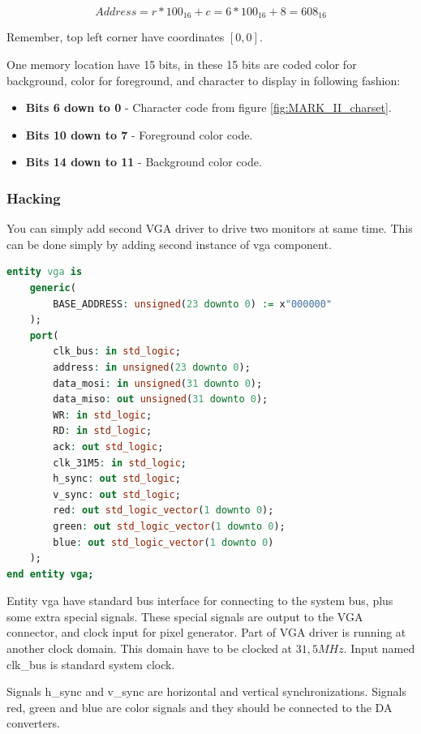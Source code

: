 $$
    Address = r * 100_{16} + c = 6 * 100_{16} + 8 = 608_{16}
$$

Remember, top left corner have coordinates $[0, 0]$.

One memory location have 15 bits, in these 15 bits are coded color for background,
color for foreground, and character to display in following fashion:

\begin{itemize}
    \item \textbf{Bits 6 down to 0} - Character code from figure \ref{fig:MARK_II_charset}.
    \item \textbf{Bits 10 down to 7} - Foreground color code.
    \item \textbf{Bits 14 down to 11} - Background color code.
\end{itemize}

\subsubsection{Hacking}

You can simply add second VGA driver to drive two monitors at same time. This
can be done simply by adding second instance of vga component.

\begin{lstlisting}[language=VHDL, frame=single]
entity vga is
    generic(
        BASE_ADDRESS: unsigned(23 downto 0) := x"000000"
    );
    port(
        clk_bus: in std_logic;
        address: in unsigned(23 downto 0);
        data_mosi: in unsigned(31 downto 0);
        data_miso: out unsigned(31 downto 0);
        WR: in std_logic;
        RD: in std_logic;
        ack: out std_logic;
        clk_31M5: in std_logic;
        h_sync: out std_logic;
        v_sync: out std_logic;
        red: out std_logic_vector(1 downto 0);
        green: out std_logic_vector(1 downto 0);
        blue: out std_logic_vector(1 downto 0)
    );
end entity vga;
\end{lstlisting}

Entity vga have standard bus interface for connecting to the system bus, plus
some extra special signals. These special signals are output to the VGA connector,
and clock input for pixel generator. Part of VGA driver is running at another
clock domain. This domain have to be clocked at $31,5MHz$. Input named clk\_bus
is standard system clock.

Signals h\_sync and v\_sync are horizontal and vertical synchronizations. Signals
red, green and blue are color signals and they should be connected to the DA converters.

